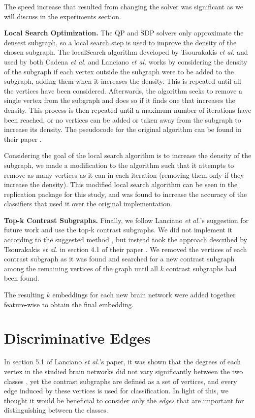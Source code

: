 \documentclass[letterpaper]{article}
\begin{document}
The speed increase that resulted from changing the solver was significant as we will discuss in the experiments section.

\textbf{Local Search Optimization.}
The QP and SDP solvers only approximate the densest subgraph, so a local search step is used to improve the density of the chosen subgraph.
The localSearch algorithm developed by Tsourakakis \emph{et al.} and used by both Cadena \emph{et al.} and Lanciano \emph{et al.} works by considering the density of the subgraph if each vertex outside the subgraph were to be added to the subgraph, adding them when it increases the density.
This is repeated until all the vertices have been considered.
Afterwards, the algorithm seeks to remove a single vertex from the subgraph and does so if it finds one that increases the density.
This process is then repeated until a maximum number of iterations have been reached, or no vertices can be added or taken away from the subgraph to increase its density.
The pseudocode for the original algorithm can be found in their paper \cite{tsourakakis2013}.

Considering the goal of the local search algorithm is to increase the density of the subgraph, we made a modification to the algorithm such that it attempts to remove as many vertices as it can in each iteration (removing them only if they increase the density).
This modified local search algorithm can be seen in the replication package for this study, and was found to increase the accuracy of the classifiers that used it over the original implementation.

\textbf{Top-k Contrast Subgraphs.}
Finally, we follow Lanciano \emph{et al.}'s suggestion for future work and use the top-k contrast subgraphs.
We did not implement it according to the suggested method \cite{balalau2015}, but instead took the approach described by Tsourakakis \emph{et al.} in section 4.1 of their paper \cite{tsourakakis2013}.
We removed the vertices of each contrast subgraph as it was found and searched for a new contrast subgraph among the remaining vertices of the graph until all $k$ contrast subgraphs had been found.

The resulting $k$ embeddings for each new brain network were added together feature-wise to obtain the final embedding.



\section{Discriminative Edges}
In section 5.1 of Lanciano \emph{et al.}'s paper, it was shown that the degrees of each vertex in the studied brain networks did not vary significantly between the two classes \cite{lanciano2020}, yet the contrast subgraphs are defined as a set of vertices, and every edge induced by these vertices is used for classification.
In light of this, we thought it would be beneficial to consider only the \emph{edges} that are important for distinguishing between the classes.
\end{document}
